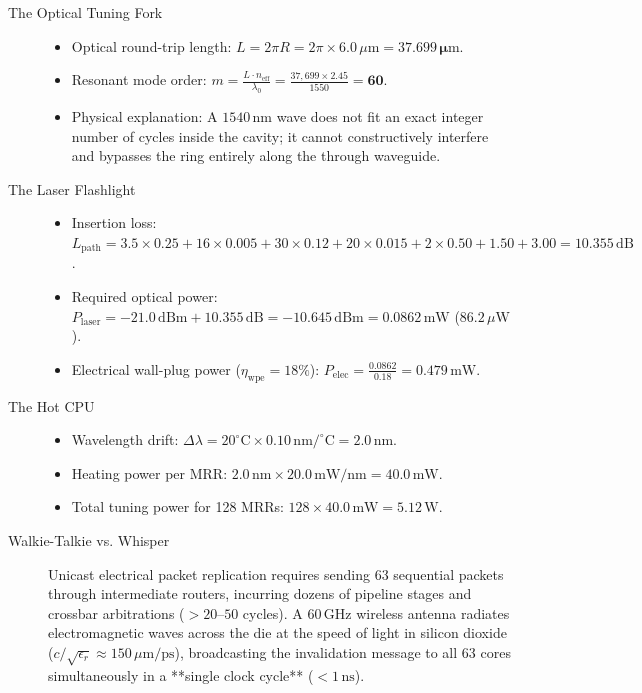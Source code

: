 \begin{description}
    \item[The Optical Tuning Fork]
    \begin{itemize}
        \item Optical round-trip length: $L = 2 \pi R = 2 \pi \times 6.0\,\mu\mathrm{m} = \mathbf{37.699\,\mu\mathrm{m}}$.
        \item Resonant mode order: $m = \frac{L \cdot n_{\mathrm{eff}}}{\lambda_0} = \frac{37,699 \times 2.45}{1550} = \mathbf{60}$.
        \item Physical explanation: A $1540\,\mathrm{nm}$ wave does not fit an exact integer number of cycles inside the cavity; it cannot constructively interfere and bypasses the ring entirely along the through waveguide.
    \end{itemize}

    \item[The Laser Flashlight]
    \begin{itemize}
        \item Insertion loss: $L_{\mathrm{path}} = 3.5 \times 0.25 + 16 \times 0.005 + 30 \times 0.12 + 20 \times 0.015 + 2 \times 0.50 + 1.50 + 3.00 = \mathbf{10.355\,\mathrm{dB}}$.
        \item Required optical power: $P_{\mathrm{laser}} = -21.0\,\mathrm{dBm} + 10.355\,\mathrm{dB} = -10.645\,\mathrm{dBm} = \mathbf{0.0862\,\mathrm{mW}}$ ($86.2\,\mu\mathrm{W}$).
        \item Electrical wall-plug power ($\eta_{\mathrm{wpe}} = 18\%$): $P_{\mathrm{elec}} = \frac{0.0862}{0.18} = \mathbf{0.479\,\mathrm{mW}}$.
    \end{itemize}

    \item[The Hot CPU]
    \begin{itemize}
        \item Wavelength drift: $\Delta \lambda = 20^\circ\mathrm{C} \times 0.10\,\mathrm{nm/^\circ C} = \mathbf{2.0\,\mathrm{nm}}$.
        \item Heating power per MRR: $2.0\,\mathrm{nm} \times 20.0\,\mathrm{mW/nm} = 40.0\,\mathrm{mW}$.
        \item Total tuning power for 128 MRRs: $128 \times 40.0\,\mathrm{mW} = \mathbf{5.12\,\mathrm{W}}$.
    \end{itemize}

    \item[Walkie-Talkie vs. Whisper] Unicast electrical packet replication requires sending 63 sequential packets through intermediate routers, incurring dozens of pipeline stages and crossbar arbitrations ($>20$--$50$ cycles). A $60\,\mathrm{GHz}$ wireless antenna radiates electromagnetic waves across the die at the speed of light in silicon dioxide ($c / \sqrt{\epsilon_r} \approx 150\,\mu\mathrm{m/ps}$), broadcasting the invalidation message to all 63 cores simultaneously in a **single clock cycle** ($<1\,\mathrm{ns}$).
\end{description}

